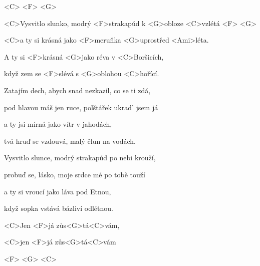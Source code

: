 

<C> <F> <G>

\zs
<C>Vysvitlo slunko, modrý <F>strakapúd k <G>obloze <C>vzlétá <F> <G>

<C>a ty si krásná jako <F>meruňka <G>uprostřed <Ami>léta.

A ty si <F>krásná <G>jako réva v <C>Boršicích,

když zem se <F>slévá s <G>oblohou <C>hořící.
\ks

\zs
Zatajím dech, abych snad nezkazil, co se ti zdá,

pod hlavou máš jen ruce, polštářek ukrad' jsem já

a ty jsi mírná jako vítr v jahodách,

tvá hruď se vzdouvá, malý člun na vodách.
\ks

\zs
Vysvitlo slunce, modrý strakapúd po nebi krouží,

probuď se, lásko, moje srdce mé po tobě touží

a ty si vroucí jako láva pod Etnou,

když sopka vstává bázliví odlétnou.
\ks

<C>Jen <F>já zůs<G>tá<C>vám,

<C>jen <F>já zůs<G>tá<C>vám

<F> <G> <C>

\kp
